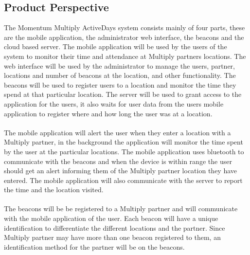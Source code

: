 \documentclass[11pt]{article}
\begin{document}
\subsection{Product Perspective}
The Momentum Multiply ActiveDays system consists mainly of four parts, these are the mobile application, the administrator web interface, the beacons and the cloud based server. The mobile application will be used by the users of the system to monitor their time and attendance at Multiply partners locations. The web interface will be used by the administrator to manage the users, partner, locations and number of beacons at the location, and other functionality. The beacons will be used to register users to a location and monitor the time they spend at that particular location. The server will be used to grant access to the application for the users, it also waits for user data from the users mobile application to register where and how long the user was at a location.\\\\
The mobile application will alert the user when they enter a location with a Multiply partner, in the background the application will monitor the time spent by the user at the particular locations. The mobile application uses bluetooth to communicate with the beacons and when the device is within range the user should get an alert informing them of the Multiply partner location they have entered. The mobile application will also communicate with the server to report the time and the location visited. \\\\
The beacons will be be registered to a Multiply partner and will communicate with the mobile application of the user. Each beacon will have a unique identification to differentiate the different locations and the partner. Since Multiply partner may have more than one beacon registered to them, an identification method for the partner will be on the beacons.\\\\
\end{document}
